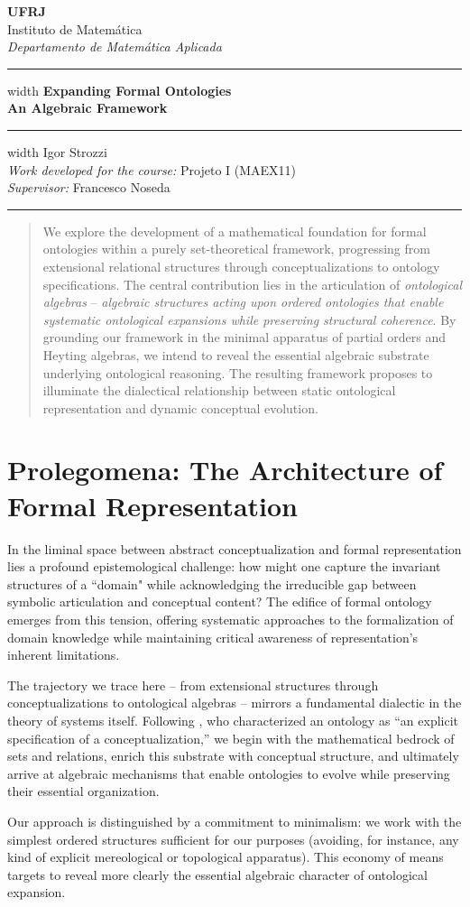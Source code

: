 \documentclass[12pt,a4paper]{article}
\date{\today}
\newcommand{\nomealuno}{Igor Strozzi}
\newcommand{\ctitle}{Expanding Formal Ontologies \vspace{0.5cm}
	\\\Large{An Algebraic Framework}}
\newcommand{\disciplina}[1]{#1}
\newcommand{\professor}{Francesco Noseda}
\newcommand{\universidade}{UFRJ}
\newcommand{\instituto}{Instituto de Matemática}
\newcommand{\departamento}{Departamento de Matemática Aplicada}
\newcommand{\maketitlecustom}{
	\thispagestyle{empty}
	\begin{center}
		{\Large \textbf{\universidade}} \\[0.3cm]
		{\Large \instituto} \\ [0.15cm]
		{\large \textit{\departamento}} \\[0.5cm]
		\hrule height 2pt width \textwidth
		\vspace{0.4cm}
		{\LARGE \textbf{\ctitle}} \\[0.4cm]
		\hrule height 2pt width \textwidth
		\vspace{0.8cm}
		{\Large \nomealuno} \\
		\vspace{0.8cm}
		{\large \textit{Work developed for the course:} \disciplina{Projeto I (MAEX11)}} \\ [0.25cm]
		{\large \textit{Supervisor:} \professor} \\
	\end{center}
	\vspace{0.5cm}
	\hrule height 1pt
	\vspace{0.5cm}
}
\begin{document}
\maketitlecustom


\begin{abstract}
We explore the development of a mathematical foundation for formal ontologies within a purely set-theoretical framework, progressing from extensional relational structures through conceptualizations to ontology specifications. The central contribution lies in the articulation of \emph{ontological algebras} -- \textit{algebraic structures acting upon ordered ontologies that enable systematic ontological expansions while preserving structural coherence}. By grounding our framework in the minimal apparatus of partial orders and Heyting algebras, we intend to reveal the essential algebraic substrate underlying ontological reasoning. The resulting framework proposes to illuminate the dialectical relationship between static ontological representation and dynamic conceptual evolution.
\end{abstract}

\newpage
\tableofcontents
\newpage
\section{Prolegomena: The Architecture of Formal Representation}

In the liminal space between abstract conceptualization and formal representation lies a profound epistemological challenge: how might one capture the invariant structures of a ``domain" while acknowledging the irreducible gap between symbolic articulation and conceptual content? The edifice of formal ontology emerges from this tension, offering systematic approaches to the formalization of domain knowledge while maintaining critical awareness of representation's inherent limitations.

The trajectory we trace here -- from extensional structures through conceptualizations to ontological algebras -- mirrors a fundamental dialectic in the theory of systems itself. Following \citet{gruber1993, guarino2009}, who characterized an ontology as ``an explicit specification of a conceptualization,'' we begin with the mathematical bedrock of sets and relations, enrich this substrate with conceptual structure, and ultimately arrive at algebraic mechanisms that enable ontologies to evolve while preserving their essential organization.

Our approach is distinguished by a commitment to minimalism: we work with the simplest ordered structures sufficient for our purposes (avoiding, for instance, any kind of explicit mereological or topological apparatus). This economy of means targets to reveal more clearly the essential algebraic character of ontological expansion.
\end{document}
